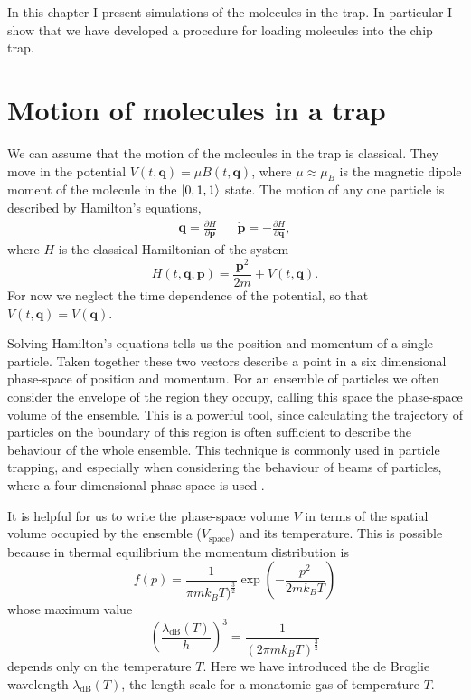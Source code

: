 In this chapter I present simulations of the molecules in the trap. In
particular I show that we have developed a procedure for loading molecules into
the chip trap.

\section{Motion of molecules in a trap}
\label{sim:motion}

We can assume that the motion of the molecules in the trap is classical. They
move in the potential $V(t, \mathbf{q}) = \mu B(t, \mathbf{q})$, where
$\mu\approx\mu_B$ is the magnetic dipole moment of the molecule in the
$\ket{0,1,1}$ state.  The motion of any one particle is described by Hamilton's
equations,~\cite{Lichtenberg1969}
%
\begin{align}
  \label{sim:eq:hamilton}
  \dot{\mathbf{q}} =  \frac{\partial H}{\partial \mathbf{p}} &&
  \dot{\mathbf{p}} = -\frac{\partial H}{\partial \mathbf{q}},
\end{align}
%
where $H$ is the classical Hamiltonian of the system
\begin{equation}
  H(t, \mathbf{q}, \mathbf{p}) = \frac{\mathbf{p}^2}{2m} + V(t, \mathbf{q}).
\end{equation}
For now we neglect the time dependence of the potential, so that $V(t,
\mathbf{q}) = V(\mathbf{q})$.

Solving Hamilton's equations tells us the position and momentum of a single
particle. Taken together these two vectors describe a point in a six
dimensional phase-space of position and momentum.
%
For an ensemble of particles we often consider the envelope of the region they
occupy, calling this space the phase-space volume of the ensemble. This is a
powerful tool, since calculating the trajectory of particles on the boundary of
this region is often sufficient to describe the behaviour of the whole
ensemble. This technique is commonly used in particle trapping, and especially
when considering the behaviour of beams of particles, where a four-dimensional
phase-space is used \cite{Hand1998, Lichtenberg1969}.

It is helpful for us to write the phase-space volume $V$ in terms of the
spatial volume occupied by the ensemble ($V_\text{space}$) and its temperature.
This is possible because in thermal equilibrium the momentum distribution is 
%
\begin{equation}
  f(p) = \frac{1}{\pi m k_B T)^\frac{3}{2}}\exp(-\frac{p^2}{2 m k_B T})
\end{equation}
%
whose maximum value
%
\begin{equation}
  \left(\frac{\lambda_\text{dB}(T)}{h}\right)^3 = \frac{1}{(2 \pi m k_B
  T)^\frac{3}{2}}
\end{equation}
%
depends only on the temperature $T$. Here we have introduced the de Broglie
wavelength $\lambda_\text{dB}(T)$, the length-scale for a monatomic gas of
temperature $T$.~\cite{blundell2}


